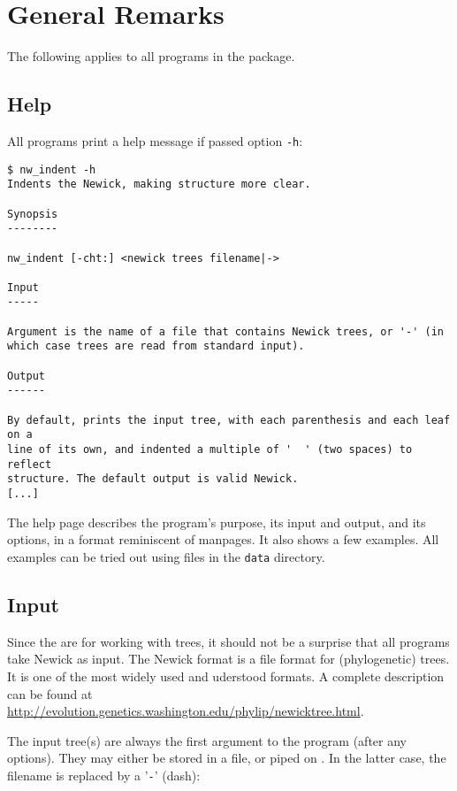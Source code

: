 
\chapter{General Remarks}
\label{chap_general}

The following applies to all programs in the \nutils{} package.

\section{Help}
\label{sect_help}

All programs print a help message if passed option \texttt{-h}:

\begin{samepage}
\begin{verbatim}
$ nw_indent -h
Indents the Newick, making structure more clear.

Synopsis
--------

nw_indent [-cht:] <newick trees filename|->

Input
-----

Argument is the name of a file that contains Newick trees, or '-' (in
which case trees are read from standard input).

Output
------

By default, prints the input tree, with each parenthesis and each leaf on a
line of its own, and indented a multiple of '  ' (two spaces) to reflect
structure. The default output is valid Newick.
[...]
\end{verbatim}
\end{samepage}
The help page describes the program's purpose, its input and output, and its options, in a format reminiscent of \unix{} manpages. It also shows a few examples. All examples can be tried out using files in the \texttt{data} directory.

\section{Input}
\label{sect_input}

Since the \nutils{} are for working with trees, it should not be a surprise that all programs take Newick as input. The Newick format is a file format for (phylogenetic) trees. It is one of the most widely used and uderstood formats.
A complete description can be found at \url{http://evolution.genetics.washington.edu/phylip/newicktree.html}.

The input tree(s) are always the first argument to the program (after any options). They may either be stored in a file, or piped on \stdin{}. In the latter case, the filename is replaced by a '\texttt{-}' (dash):

